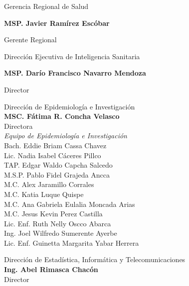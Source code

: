 \documentclass[12pt,a4paper,openany]{book}
\begin{document}
	
	\begin{center}
		
		{\large Gerencia Regional de Salud}
		
		\textbf{MSP. Javier Ramírez Escóbar}
		
		Gerente Regional \vspace{1.0cm}
		
		Dirección Ejecutiva de Inteligencia Sanitaria
		
		\textbf{MSP. Darío Francisco Navarro Mendoza}
		
		Director
		
		\vspace{1.5cm}
		\noindent
		\begin{minipage}[t]{.45\textwidth}
			\centering
			Dirección de Epidemiología e Investigación  \\
			\textbf{MSC. Fátima R. Concha Velasco}\\
			Directora \vspace{1.0cm}\\
			\textit{Equipo de Epidemiología e Investigación }\vspace{.5cm}\\
			Bach. Eddie Briam Cassa Chavez \\
			Lic. Nadia Isabel Cáceres Pillco \\
			TAP. Edgar Waldo Capcha Salcedo \\
			M.S.P. Pablo Fidel Grajeda Ancca \\
			M.C. Alex Jaramillo Corrales \\ 
			M.C. Katia Luque Quispe \\
			M.C. Ana Gabriela Eulalia Moncada Arias \\
			M.C. Jesus Kevin Perez Castilla \\
			Lic. Enf. Ruth Nelly Oscco Abarca \\
			Ing. Joel Wilfredo Sumerente Ayerbe \\
			Lic. Enf. Guinetta Margarita Yabar Herrera \vspace{1.5cm}\\	
		\end{minipage}
		\hfill
		\noindent
		\begin{minipage}[t]{.45\textwidth}
			\centering
			Dirección de Estadística, Informática y Telecomunicaciones\\
			\textbf{Ing. Abel Rimasca Chacón} \\
			Director \vspace{1.0cm} \\

\end{minipage}
\end{center}
\end{document}
